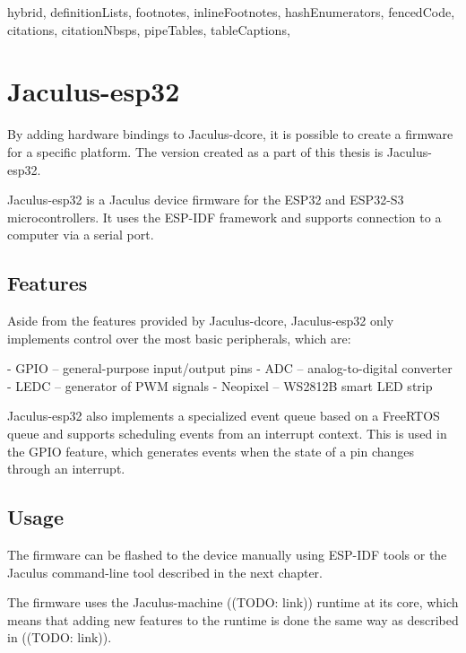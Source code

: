\begin{markdown*}{%
  hybrid,
  definitionLists,
  footnotes,
  inlineFootnotes,
  hashEnumerators,
  fencedCode,
  citations,
  citationNbsps,
  pipeTables,
  tableCaptions,
}

\chapter{Jaculus-esp32}

By adding hardware bindings to Jaculus-dcore, it is possible to create a firmware for a specific platform. The version created as a part of this thesis is Jaculus-esp32.

Jaculus-esp32 is a Jaculus device firmware for the ESP32 and ESP32-S3 microcontrollers. It uses the ESP-IDF framework and supports connection to a computer via a serial port.

\section{Features}

Aside from the features provided by Jaculus-dcore, Jaculus-esp32 only implements control over the most basic peripherals, which are:

  - GPIO -- general-purpose input/output pins
  - ADC -- analog-to-digital converter
  - LEDC -- generator of PWM signals
  - Neopixel -- WS2812B smart LED strip

Jaculus-esp32 also implements a specialized event queue based on a FreeRTOS queue and supports scheduling events from an interrupt context. This is used in the GPIO feature, which generates events when the state of a pin changes through an interrupt.


\section{Usage}

The firmware can be flashed to the device manually using ESP-IDF tools or the Jaculus command-line tool described in the next chapter.

The firmware uses the Jaculus-machine ((TODO: link)) runtime at its core, which means that adding new features to the runtime is done the same way as described in ((TODO: link)).

\end{markdown*}
